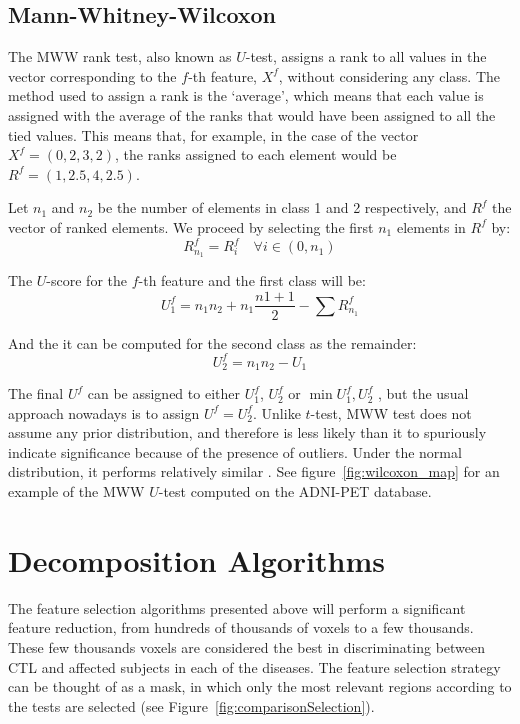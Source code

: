\subsection{Mann-Whitney-Wilcoxon} 
The \acf{MWW} rank test, also known as $U$-test, assigns a rank to all values in the vector corresponding to the $f$-th feature, $X^f$, without considering any class. The method used to assign a rank is the `average', which means that each value is assigned with the average of the ranks that would have been assigned to all the tied values. This means that, for example, in the case of the vector $X^f=(0,2,3,2)$, the ranks assigned to each element would be $R^f=(1,2.5,4,2.5)$. 

Let $n_1$ and $n_2$ be the number of elements in class 1 and 2 respectively, and $R^f$ the vector of ranked elements. We proceed by selecting the first $n_1$ elements in $R^f$ by: 
\begin{equation}
	R^f_{n_1} = {R^f_i} \quad \forall i\in(0,n_1)
\end{equation}

The $U$-score for the $f$-th feature and the first class will be: 
\begin{equation}
	U_1^f = n_1 n_2 + n_1 \frac{n1+1}{2} - \sum R^f_{n_1}
\end{equation}

And the it can be computed for the second class as the remainder: 
\begin{equation}
	U_2^f = n_1 n_2 - U_1
\end{equation}

The final $U^f$ can be assigned to either $U_1^f$, $U_2^f$ or $\min{U_1^f,U_2^f}$ \cite{Fay10}, but the usual approach nowadays is to assign $U^f=U_2^f$. Unlike $t$-test, \ac{MWW} test does not assume any prior distribution, and therefore is less likely than it to spuriously indicate significance because of the presence of outliers. Under the normal distribution, it performs relatively similar \cite{Fay10}. See figure~\ref{fig:wilcoxon_map} for an example of the \ac{MWW} $U$-test computed on the ADNI-PET database.

\section{Decomposition Algorithms}
The feature selection algorithms presented above will perform a significant feature reduction, from hundreds of thousands of voxels to a few thousands. These few thousands voxels are considered the best in discriminating between \ac{CTL} and affected subjects in each of the diseases. The feature selection strategy can be thought of as a mask, in which only the most relevant regions according to the tests are selected (see Figure~\ref{fig:comparisonSelection}). 

